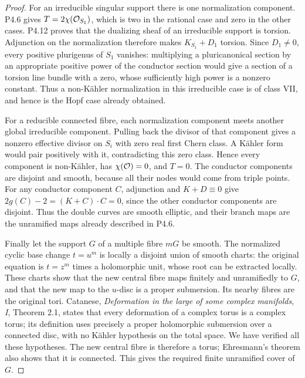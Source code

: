 \begin{proof}
For an irreducible singular support there is one normalization
component. P4.6 gives $T=2\chi(\mathcal O_{S_1})$, which is two in the
rational case and zero in the other cases. P4.12 proves that the
dualizing sheaf of an irreducible support is torsion. Adjunction on
the normalization therefore makes $K_{S_1}+D_1$ torsion. Since
$D_1\ne0$, every positive plurigenus of $S_1$ vanishes: multiplying
a pluricanonical section by an appropriate positive power of the
conductor section would give a section of a torsion line bundle with
a zero, whose sufficiently high power is a nonzero constant. Thus a
non-Kähler normalization in this irreducible case is of class VII,
and hence is the Hopf case already obtained.

For a reducible connected fibre, each normalization component meets
another global irreducible component. Pulling back the divisor of
that component gives a nonzero effective divisor on $S_i$ with zero
real first Chern class. A Kähler form would pair positively with it,
contradicting this zero class. Hence every component is non-Kähler,
has $\chi(\mathcal O)=0$, and $T=0$. The conductor components are disjoint
and smooth, because all their nodes would come from triple points.
For any conductor component $C$, adjunction and $K+D\equiv0$ give
$2g(C)-2=(K+C)\cdot C=0$, since the other conductor components
are disjoint. Thus the double curves are smooth elliptic, and their
branch maps are the unramified maps already described in P4.6.

Finally let the support $G$ of a multiple fibre $mG$ be smooth. The
normalized cyclic base change $t=u^m$ is locally a disjoint union of
smooth charts: the original equation is $t=z^m$ times a holomorphic
unit, whose root can be extracted locally. These charts show that
the new central fibre maps finitely and unramifiedly to $G$, and
that the new map to the $u$-disc is a proper submersion. Its nearby
fibres are the original tori. Catanese, \emph{Deformation in the
large of some complex manifolds, I}, Theorem 2.1, states that every
deformation of a complex torus is a complex torus; its definition
uses precisely a proper holomorphic submersion over a connected
disc, with no Kähler hypothesis on the total space. We have verified
all these hypotheses. The new central fibre is therefore a torus;
Ehresmann's theorem also shows that it is connected. This gives
the required finite unramified cover of $G$.
\end{proof}

